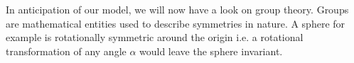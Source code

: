 In anticipation of our model, we will now have a look on group theory. Groups are mathematical entities used to describe symmetries in nature.
A sphere for example is rotationally symmetric around the origin i.e. a rotational transformation of any angle $\alpha$ would leave the sphere 
invariant. 







